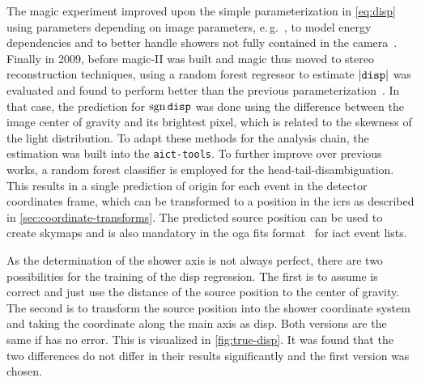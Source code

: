 The \gls{magic} experiment improved upon the simple parameterization in \eqref{eq:disp} using parameters
  depending on image parameters, e.\,g.\ ,
to model energy dependencies and  to better handle showers
not fully contained in the camera~\cite{magic-disp}.
Finally in 2009, before \gls{magic}-II was built and \gls{magic} thus moved
to stereo reconstruction techniques, using a random forest regressor to estimate 
$\vert\mathtt{disp}\vert$ was evaluated and found to perform better than the previous parameterization~\cite{magic-disp-rf}.
In that case, the prediction for $\operatorname{sgn}{\mathtt{disp}}$ was done using the difference between the image center
of gravity and its brightest pixel, which is related to the skewness of the light distribution.
To adapt these methods for the \facttools{} analysis chain, the  estimation
was built into the \texttt{aict-tools}.
To further improve over previous works, a random forest classifier is employed
for the head-tail-disambiguation.
This results in a single prediction of origin for each event in the
detector coordinates frame, which can be transformed
to a position in the \gls{icrs} as described in \autoref{sec:coordinate-transforms}.
The predicted source position can be used to create skymaps and is also mandatory 
in the \gls{oga} fits format~\cite{ogadf} for \gls{iact} event lists.

As the determination of the shower axis is not always perfect,
there are two possibilities for the training of the disp regression.
The first is to assume  is correct and just use the distance of the 
source position to the center of gravity.
The second is to transform the source position into the shower coordinate system 
and taking the coordinate along the main axis as disp.
Both versions are the same if  has no error.
This is visualized in \autoref{fig:true-disp}.
It was found that the two differences do not differ in their results significantly
and the first version was chosen.
